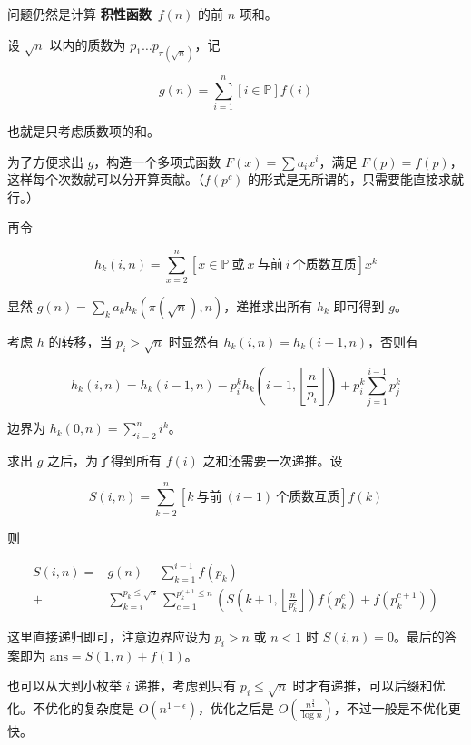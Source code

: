 问题仍然是计算 \textbf{积性函数}\ $f(n)$ 的前 $n$ 项和。

设 $\sqrt n$ 以内的质数为 $p_1 \dots p_{\pi\left(\sqrt n\right)}$，记

$$ g(n) = \sum_{i = 1} ^ n \left[i \in \mathbb{P}\right] f(i) $$

也就是只考虑质数项的和。

为了方便求出 $g$，构造一个多项式函数 $F(x) = \sum a_i x^i$，满足 $F(p) = f(p)$，这样每个次数就可以分开算贡献。（$f(p^c)$ 的形式是无所谓的，只需要能直接求就行。）

再令

$$ h_k(i, n) = \sum_{x = 2} ^ n \left[ x \in \mathbb{P}\ \text{或}\ x\ \text{与前}\ i\ \text{个质数互质} \right] x^k $$

显然 $g(n) = \sum_k a_k h_k\left( \pi\left(\sqrt n\right), n \right)$，递推求出所有 $h_k$ 即可得到 $g$。

考虑 $h$ 的转移，当 $p_i > \sqrt n$ 时显然有 $h_k(i, n) = h_k(i - 1, n)$，否则有

$$ h_k(i, n) =  h_k(i - 1, n) - p_i ^ k h_k\left( i - 1, \left\lfloor \frac n {p_i} \right\rfloor \right) + p_i ^ k \sum_{j = 1} ^ {i - 1} p_j ^ k $$

边界为 $h_k(0, n) = \sum_{i = 2} ^ n i^k$。

求出 $g$ 之后，为了得到所有 $f(i)$ 之和还需要一次递推。设

$$ S(i, n) = \sum_{k = 2} ^ n \left[ k\ \text{与前}\ (i - 1)\ \text{个质数互质} \right] f(k) $$

则

$$ \begin{aligned} S(i, n) = & g(n) - \sum_{k = 1} ^ {i - 1} f(p_k) \\
+ & \sum_{k = i} ^ {p_k \le \sqrt n} \sum_{c = 1} ^ {p_k ^ {c + 1} \le n} \left( S\left( k + 1, \left\lfloor \frac n {p_k ^ c} \right\rfloor \right) f\left( p_k ^ c \right) + f\left( p_k ^ {c + 1} \right) \right) \end{aligned} $$

这里直接递归即可，注意边界应设为 $p_i > n$ 或 $n < 1$ 时 $S(i, n) = 0$。最后的答案即为 $\text{ans} = S(1, n) + f(1)$。

也可以从大到小枚举 $i$ 递推，考虑到只有 $p_i \le \sqrt n$ 时才有递推，可以后缀和优化。不优化的复杂度是 $O(n^{1 - \epsilon})$，优化之后是 $O\left( \frac {n^{\frac 3 4}} {\log n} \right)$，不过一般是不优化更快。

\inputminted{cpp}{../src/numbertheory/min25.cpp}
